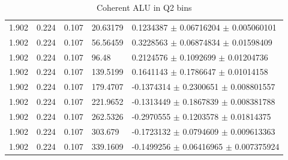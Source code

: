 \begin{table}[!h]
\begin{center}
\begin{tabular}{||l|l|l|l|l||}
         \hline
         1.902 & 0.224 & 0.107 &    20.63179 &  0.1234387 $\pm$   0.06716204 
$\pm$   0.005060101   \\
         1.902 & 0.224 & 0.107 &    56.56459 &  0.3228563 $\pm$   0.06874834 $\pm$   0.01598409    \\
         1.902 & 0.224 & 0.107 &    96.48    &  0.2124576 $\pm$   0.1092699  $\pm$    0.01204736   \\
         1.902 & 0.224 & 0.107 &    139.5199 &  0.1641143 $\pm$   0.1786647  $\pm$    0.01014158   \\
         1.902 & 0.224 & 0.107 &    179.4707 & -0.1374314 $\pm$   0.2300651  $\pm$    0.008801557  \\
         1.902 & 0.224 & 0.107 &    221.9652 & -0.1313449 $\pm$   0.1867839  $\pm$    0.008381788  \\
         1.902 & 0.224 & 0.107 &    262.5326 & -0.2970555 $\pm$   0.1203578  $\pm$    0.01814375   \\
         1.902 & 0.224 & 0.107 &    303.679  & -0.1723132 $\pm$   0.0794609  $\pm$    0.009613363  \\
         1.902 & 0.224 & 0.107 &    339.1609 & -0.1499256 $\pm$   0.06416965 $\pm$   0.007375924   \\

      \hline 
      \hline
      \end{tabular}
      \caption{ Coherent ALU in Q2 bins}
      \label{table:Coh_Q2_BSA}
   \end{center}
\end{table}                    

